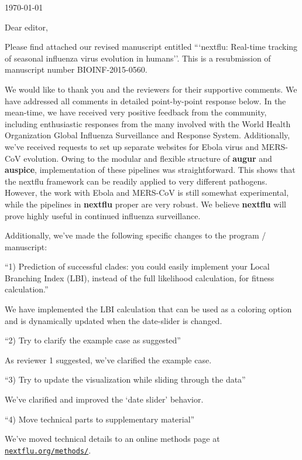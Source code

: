 \documentclass[11pt,oneside,letterpaper]{article}
\newcommand{\augur}{\textbf{augur}}
\newcommand{\auspice}{\textbf{auspice}}
\newcommand{\nextflu}{\textbf{nextflu}}
\begin{document}

\today

\vspace{1cm}

Dear editor,

Please find attached our revised manuscript entitled ```nextflu: Real-time tracking of seasonal influenza virus evolution in humans''.  This is a resubmission of manuscript number BIOINF-2015-0560.

We would like to thank you and the reviewers for their supportive comments. We have addressed all comments in detailed point-by-point response below. In the mean-time, we have received very positive feedback from the community, including enthusiastic responses from the many involved with the World Health Organization Global Influenza Surveillance and Response System. Additionally, we've received requests to set up separate websites for Ebola virus and MERS-CoV evolution. Owing to the modular and flexible structure of \augur{} and \auspice{}, implementation of these pipelines was straightforward. This shows that the nextflu framework can be readily applied to very different pathogens. However, the work with Ebola and MERS-CoV is still somewhat experimental, while the pipelines in \nextflu{} proper are very robust. We believe \nextflu{} will prove highly useful in continued influenza surveillance.

Additionally, we've made the following specific changes to the program / manuscript:

``1) Prediction of successful clades: you could easily implement your Local Branching Index (LBI), instead of the full likelihood calculation, for fitness calculation.''

We have implemented the LBI calculation that can be used as a coloring option and is dynamically updated when the date-slider is changed.

``2) Try to clarify the example case as suggested''

As reviewer 1 suggested, we've clarified the example case.

``3) Try to update the visualization while sliding through the data''

We've clarified and improved the `date slider' behavior.

``4) Move technical parts to supplementary material''

We've moved technical details to an online methods page at \href{http://nextflu.org/methods/}{\texttt{nextflu.org/methods/}}.
\end{document}
